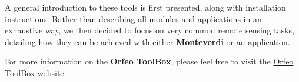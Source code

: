 \documentclass{InsightSoftwareGuide}
\newcommand{\otb}{\textbf{Orfeo ToolBox}\xspace}
\newcommand{\mont}{\textbf{Monteverdi}\xspace}
\newcommand{\website}{\href{http://orfeo-toolbox.org}{Orfeo ToolBox website}\xspace}
\begin{document}
A general introduction to these tools is first presented, along
with installation instructions. Rather than describing all modules and
applications in an exhaustive way, we then decided to focus on very
common remote sensing tasks, detailing how they can be achieved with
either \mont or an application.

For more information on the \otb, please feel free to visit the \website.

%
%


%
\pagestyle{normal}
%
\small
\tableofcontents
\listoffigures
\listoftables
\normalsize

%
%

\mainmatter



%




%


\end{document}
